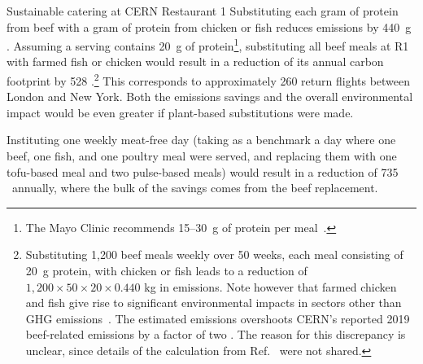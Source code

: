 \documentclass[../SustainableHEP.tex]{subfiles}
\begin{document}
\begin{casestudy}{Sustainable catering at CERN Restaurant 1}
    Substituting each gram of protein from beef with a gram of protein from chicken or fish reduces emissions by 440~g \CdOe.  
    Assuming a serving contains 20~g of protein\footnote{The Mayo Clinic recommends 15--30~g of protein per meal~\cite{MAYO}.}, substituting all beef meals at R1 with farmed fish or chicken would result in a reduction of its annual carbon footprint by 528 \tCdOe.\footnote{Substituting 1,200 beef meals weekly over 50 weeks, each meal consisting of 20~g protein, with chicken or fish leads to a reduction of $1,200\times 50\times 20\times 0.440$ kg \CdOe \; in emissions. Note however that farmed chicken and fish give rise to significant environmental impacts in sectors other than GHG emissions~\cite{KUEMPEL2023}.  The estimated emissions overshoots CERN's reported 2019 beef-related emissions by a factor of two \cite{HSENote}.  The reason for this discrepancy is unclear, since details of the calculation from Ref.~\cite{HSENote} were not shared.}
    This corresponds to approximately  260 return flights between London and New York. 
    Both the emissions savings and the overall environmental impact would be even greater if plant-based substitutions were made.

    Instituting one weekly meat-free day (taking as a benchmark a day where one beef, one fish, and one poultry meal were served, and replacing them with one tofu-based meal and two pulse-based meals) would result in a reduction of 735 \tCdOe\ annually, where the bulk of the savings comes from the beef replacement.
\end{casestudy}
\end{document}
